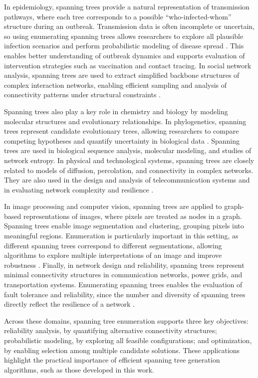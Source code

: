 \documentclass{article}
\begin{document}
In epidemiology, spanning trees provide a natural representation of transmission pathways, where each tree corresponds to a possible “who-infected-whom” structure during an outbreak. Transmission data is often incomplete or uncertain, so using enumerating spanning trees allows researchers to explore all plausible infection scenarios and perform probabilistic modeling of disease spread \cite{scott2021genomic, rahman2025epidemiology}. This enables better understanding of outbreak dynamics and supports evaluation of intervention strategies such as vaccination and contact tracing. In social network analysis, spanning trees are used to extract simplified backbone structures of complex interaction networks, enabling efficient sampling and analysis of connectivity patterns under structural constraints \cite{lee2024social}.

Spanning trees also play a key role in chemistry and biology by modeling molecular structures and evolutionary relationships. In phylogenetics, spanning trees represent candidate evolutionary trees, allowing researchers to compare competing hypotheses and quantify uncertainty in biological data \cite{graph_theory_mst_applications}. Spanning trees are used in biological sequence analysis, molecular modeling, and studies of network entropy. In physical and technological systems, spanning trees are closely related to models of diffusion, percolation, and connectivity in complex networks. They are also used in the design and analysis of telecommunication systems and in evaluating network complexity and resilience \cite{nature_complex_networks}.

In image processing and computer vision, spanning trees are applied to graph-based representations of images, where pixels are treated as nodes in a graph. Spanning trees enable image segmentation and clustering, grouping pixels into meaningful regions. Enumeration is particularly important in this setting, as different spanning trees correspond to different segmentations, allowing algorithms to explore multiple interpretations of an image and improve robustness \cite{gfg_spanning_tree,mst_image_segmentation}. Finally, in network design and reliability, spanning trees represent minimal connectivity structures in communication networks, power grids, and transportation systems. Enumerating spanning trees enables the evaluation of fault tolerance and reliability, since the number and diversity of spanning trees directly reflect the resilience of a network \cite{ding2024reliability}.

Across these domains, spanning tree enumeration supports three key objectives: reliability analysis, by quantifying alternative connectivity structures; probabilistic modeling, by exploring all feasible configurations; and optimization, by enabling selection among multiple candidate solutions. These applications highlight the practical importance of efficient spanning tree generation algorithms, such as those developed in this work.
\end{document}

